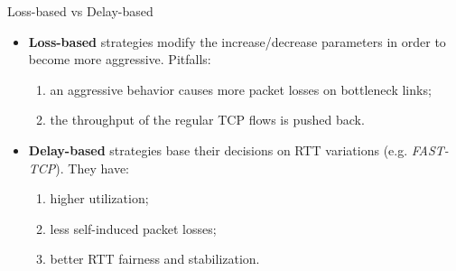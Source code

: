 \begin{frame}{Loss-based vs Delay-based}
	\begin{itemize}
		\item \textbf{Loss-based} strategies modify the increase/decrease parameters
		      in order to become more aggressive. Pitfalls:
			\begin{enumerate}
				\item an aggressive behavior
				      causes more packet losses on bottleneck links;
				\item the throughput of the regular TCP flows is pushed back.
			\end{enumerate}
		\item \textbf{Delay-based} strategies
		      base their decisions on
		      RTT variations (e.g. \textit{FAST-TCP}). They have:
		      \begin{enumerate}
		         \item higher utilization;
		         \item less self-induced packet losses;
		         \item better RTT fairness and stabilization.
		      \end{enumerate}
	\end{itemize}
\end{frame}
